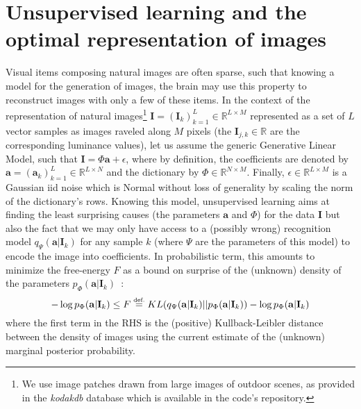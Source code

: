 \documentclass[a4paper, 11pt, draft]{article} %
\newcommand{\coef}{\mathbf{a}} %
\newcommand{\image}{\mathbf{I}} %
\newcommand{\dico}{\Phi} %
\newcommand{\eqdef}{\ensuremath{\stackrel{\mbox{\upshape\tiny def.}}{=}}}
\newcommand{\RR}{\mathbb{R}}
\begin{document}
\section{Unsupervised learning and the optimal representation of images}%
%
Visual items composing natural images are often sparse, such that knowing a model for the generation of images, the brain may use this property to reconstruct images with only a few of these items. 
In the context of the representation of natural images\footnote{We use image patches drawn from large images of outdoor scenes, as provided in the \emph{kodakdb} database which is available in the code's repository.} $\image = (\image_k)_{k=1}^L \in \RR^{L \times M}$ represented as a set of $L$ vector samples as images raveled along $M$ pixels (the $\image_{j, k} \in \RR$ are the corresponding luminance values), let us assume the generic Generative Linear Model, such that $\image = \dico \coef + \epsilon $, where by definition, the coefficients are denoted by $\coef = (\coef_k)_{k=1}^L \in \RR^{L \times N}$ and the dictionary by $\dico \in \RR^{N \times M}$. Finally, $\epsilon \in \RR^{L \times M}$ is a Gaussian iid noise which is Normal without loss of generality by scaling the norm of the dictionary's rows. Knowing this model, unsupervised learning aims at finding the least surprising causes (the parameters $\coef$ and $\dico$) for the data $\image$ but also the fact that we may only have access to a (possibly wrong) recognition model $q_\Psi(\coef | \image_k)$ for any sample $k$ (where $\Psi$ are the parameters of this model) to encode the image into coefficients. In probabilistic term, this amounts to minimize the free-energy $F$ as a bound on surprise of the (unknown) density of the parameters $p_\dico( \coef | \image_k)$~\citep{Friston12,Kingma13,Doersch2016}:
\begin{equation} -\log p_\dico( \coef | \image_k) \leq F \eqdef KL( q_\Psi(\coef | \image_k) || p_\dico( \coef | \image_k) )  -\log p_\dico( \coef | \image_k) \end{equation}
where the first term in the RHS is the (positive) Kullback-Leibler distance between the density of images using the current estimate of the (unknown) marginal posterior probability.
\end{document}

